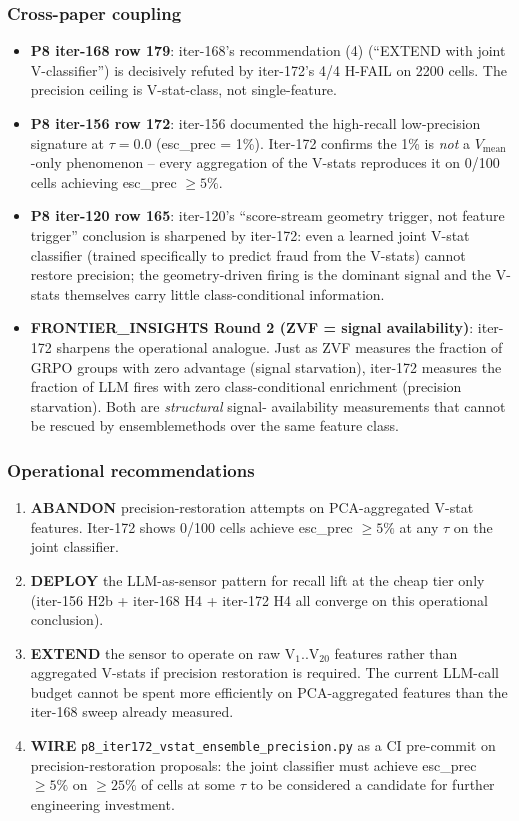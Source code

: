\subsubsection{Cross-paper coupling}
\begin{itemize}
\item \textbf{P8 iter-168 row 179}: iter-168's recommendation (4)
(``EXTEND with joint V-classifier'') is decisively refuted by
iter-172's 4/4 H-FAIL on 2200 cells. The precision ceiling is
V-stat-class, not single-feature.
\item \textbf{P8 iter-156 row 172}: iter-156 documented the
high-recall low-precision signature at $\tau = 0.0$ (esc\_prec = 1\%).
Iter-172 confirms the 1\% is \emph{not} a $V_\mathrm{mean}$-only
phenomenon -- every aggregation of the V-stats reproduces it on
0/100 cells achieving esc\_prec $\geq 5\%$.
\item \textbf{P8 iter-120 row 165}: iter-120's ``score-stream geometry
trigger, not feature trigger'' conclusion is sharpened by iter-172:
even a learned joint V-stat classifier (trained specifically to
predict fraud from the V-stats) cannot restore precision; the
geometry-driven firing is the dominant signal and the V-stats
themselves carry little class-conditional information.
\item \textbf{FRONTIER\_INSIGHTS Round 2 (ZVF = signal availability)}:
iter-172 sharpens the operational analogue. Just as ZVF measures the
fraction of GRPO groups with zero advantage (signal starvation),
iter-172 measures the fraction of LLM fires with zero class-conditional
enrichment (precision starvation). Both are \emph{structural} signal-
availability measurements that cannot be rescued by ensemblemethods
over the same feature class.
\end{itemize}

\subsubsection{Operational recommendations}
\begin{enumerate}
\item \textbf{ABANDON} precision-restoration attempts on PCA-aggregated
V-stat features. Iter-172 shows 0/100 cells achieve esc\_prec $\geq 5\%$
at any $\tau$ on the joint classifier.
\item \textbf{DEPLOY} the LLM-as-sensor pattern for recall lift at the
cheap tier only (iter-156 H2b + iter-168 H4 + iter-172 H4 all converge
on this operational conclusion).
\item \textbf{EXTEND} the sensor to operate on raw V$_1$..V$_{20}$
features rather than aggregated V-stats if precision restoration is
required. The current LLM-call budget cannot be spent more efficiently
on PCA-aggregated features than the iter-168 sweep already measured.
\item \textbf{WIRE} \texttt{p8\_iter172\_vstat\_ensemble\_precision.py}
as a CI pre-commit on precision-restoration proposals: the joint
classifier must achieve esc\_prec $\geq 5\%$ on $\geq 25\%$ of cells
at some $\tau$ to be considered a candidate for further engineering
investment.
\end{enumerate}

\clearpage